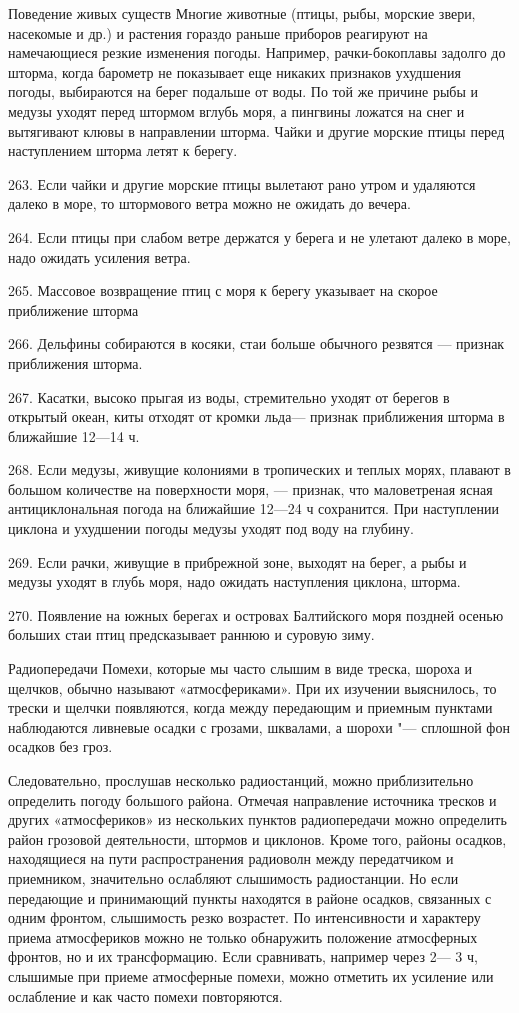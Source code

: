 Поведение живых существ
Многие животные (птицы, рыбы, морские звери, насекомые и др.) и растения гораздо раньше приборов реагируют на намечающиеся резкие изменения погоды. Например, рачки-бокоплавы задолго до шторма, когда барометр не показывает еще никаких признаков ухудшения погоды, выбираются на берег подальше от воды. По той же причине рыбы и медузы уходят перед штормом вглубь моря, а пингвины ложатся на снег и вытягивают клювы в направлении шторма. Чайки и другие морские птицы перед наступлением шторма летят к берегу.

263. Если чайки и другие морские птицы вылетают рано утром и удаляются далеко в море, то штормового ветра можно не ожидать до вечера.

264. Если птицы при слабом ветре держатся у берега и не улетают далеко в море, надо ожидать усиления ветра.

265. Массовое возвращение птиц с моря к берегу указывает на скорое приближение шторма

266. Дельфины собираются в косяки, стаи больше обычного резвятся — признак приближения шторма.

267. Касатки, высоко прыгая из воды, стремительно уходят от берегов в открытый океан, киты отходят от кромки льда— признак приближения шторма в ближайшие 12—14 ч.

268. Если медузы, живущие колониями в тропических и теплых морях, плавают в большом количестве на поверхности моря, — признак, что маловетреная ясная антициклональная погода на ближайшие 12—24 ч сохранится. При наступлении циклона и ухудшении погоды медузы уходят под воду на глубину.

269. Если рачки, живущие в прибрежной зоне, выходят на берег, а рыбы и медузы уходят в глубь моря, надо ожидать наступления циклона, шторма.

270. Появление на южных берегах и островах Балтийского моря поздней осенью больших стаи птиц предсказывает раннюю и суровую зиму.

Радиопередачи
Помехи, которые мы часто слышим в виде треска, шороха и щелчков, обычно называют «атмосфериками». При их изучении выяснилось, то трески и щелчки появляются, когда между передающим и приемным пунктами наблюдаются ливневые осадки с грозами, шквалами, а шорохи "--- сплошной фон осадков без гроз.

Следовательно, прослушав несколько радиостанций, можно приблизительно определить погоду большого района. Отмечая направление источника тресков и других «атмосфериков» из нескольких пунктов радиопередачи можно определить район грозовой деятельности, штормов и циклонов. Кроме того, районы осадков, находящиеся на пути распространения радиоволн между передатчиком и приемником, значительно ослабляют слышимость радиостанции. Но если передающие и принимающий пункты находятся в районе осадков, связанных с одним фронтом, слышимость резко возрастет. По интенсивности и характеру приема атмосфериков можно не только обнаружить положение атмосферных фронтов, но и их трансформацию. Если сравнивать, например через 2— 3 ч, слышимые при приеме атмосферные помехи, можно отметить их усиление или ослабление и как часто помехи повторяются.

